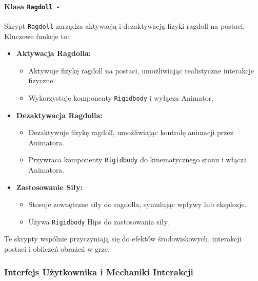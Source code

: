 \paragraph{Klasa \texttt{Ragdoll -}}
Skrypt \texttt{Ragdoll} zarządza aktywacją i dezaktywacją fizyki ragdoll na postaci. Kluczowe funkcje to:
\begin{itemize}
\item \textbf{Aktywacja Ragdolla:}
    \begin{itemize}
        \item Aktywuje fizykę ragdoll na postaci, umożliwiając realistyczne interakcje fizyczne.
        \item Wykorzystuje komponenty \texttt{Rigidbody} i wyłącza Animator.
    \end{itemize}
\item \textbf{Dezaktywacja Ragdolla:}
    \begin{itemize}
        \item Dezaktywuje fizykę ragdoll, umożliwiając kontrolę animacji przez Animatora.
        \item Przywraca komponenty \texttt{Rigidbody} do kinematycznego stanu i włącza Animatora.
    \end{itemize}
\item \textbf{Zastosowanie Siły:}
    \begin{itemize}
        \item Stosuje zewnętrzne siły do ragdolla, symulując wpływy lub eksplozje.
        \item Używa \texttt{Rigidbody} Hips do zastosowania siły.
    \end{itemize}
\end{itemize}

Te skrypty wspólnie przyczyniają się do efektów środowiskowych, interakcji postaci i obliczeń obrażeń w grze.

\subsubsection{Interfejs Użytkownika i Mechaniki Interakcji}

